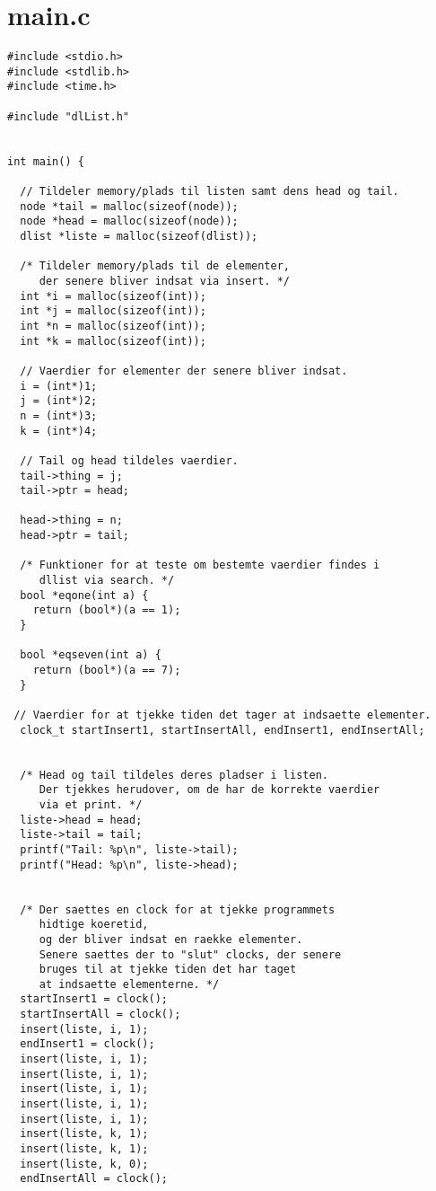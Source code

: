 \documentclass[a4paper,12pt]{article}
\begin{document}
\section*{main.c}
\begin{lstlisting}
#include <stdio.h>
#include <stdlib.h>
#include <time.h>

#include "dlList.h"


int main() {

  // Tildeler memory/plads til listen samt dens head og tail.
  node *tail = malloc(sizeof(node));
  node *head = malloc(sizeof(node));
  dlist *liste = malloc(sizeof(dlist));

  /* Tildeler memory/plads til de elementer, 
     der senere bliver indsat via insert. */
  int *i = malloc(sizeof(int));
  int *j = malloc(sizeof(int));
  int *n = malloc(sizeof(int));
  int *k = malloc(sizeof(int));

  // Vaerdier for elementer der senere bliver indsat.
  i = (int*)1;
  j = (int*)2;
  n = (int*)3;
  k = (int*)4;

  // Tail og head tildeles vaerdier.
  tail->thing = j;
  tail->ptr = head;

  head->thing = n;
  head->ptr = tail;

  /* Funktioner for at teste om bestemte vaerdier findes i 
     dllist via search. */
  bool *eqone(int a) {
    return (bool*)(a == 1);
  }

  bool *eqseven(int a) {
    return (bool*)(a == 7);
  }

 // Vaerdier for at tjekke tiden det tager at indsaette elementer.
  clock_t startInsert1, startInsertAll, endInsert1, endInsertAll;


  /* Head og tail tildeles deres pladser i listen.
     Der tjekkes herudover, om de har de korrekte vaerdier 
     via et print. */
  liste->head = head;
  liste->tail = tail;
  printf("Tail: %p\n", liste->tail);
  printf("Head: %p\n", liste->head);


  /* Der saettes en clock for at tjekke programmets 
     hidtige koeretid,
     og der bliver indsat en raekke elementer.
     Senere saettes der to "slut" clocks, der senere 
     bruges til at tjekke tiden det har taget
     at indsaette elementerne. */
  startInsert1 = clock();
  startInsertAll = clock();
  insert(liste, i, 1);
  endInsert1 = clock();
  insert(liste, i, 1);
  insert(liste, i, 1);
  insert(liste, i, 1);
  insert(liste, i, 1);
  insert(liste, i, 1);
  insert(liste, k, 1);
  insert(liste, k, 1);
  insert(liste, k, 0);
  endInsertAll = clock();



\end{lstlisting}
\end{document}
